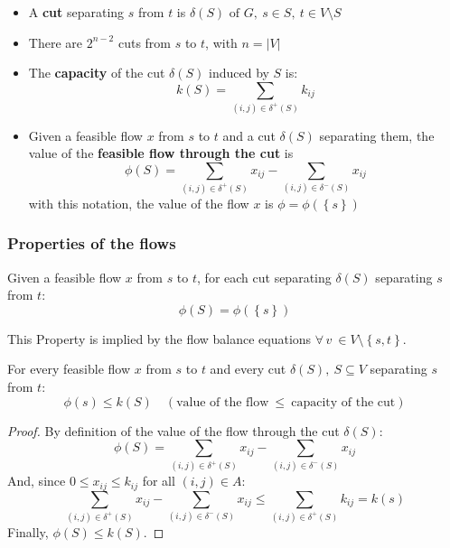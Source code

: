 \documentclass[english]{article}
\begin{document}
\begin{itemize}
  \item A \textbf{cut} separating \(s\) from \(t\) is \(\delta(S) \text{ of } G, \ s \in S, \ t \in V \setminus S\)
  \item There are \(2^{n-2}\) cuts from \(s\) to \(t\), with \(n = |V|\)
  \item The \textbf{capacity} of the cut \(\delta(S)\) induced by \(S\) is: \[ k(S) = \displaystyle \sum_{\left( i, j \right) \in \delta^+(S)} k_{ij} \]
  \item Given a feasible flow \(x\) from \(s\) to \(t\) and a cut \(\delta(S)\) separating them, the value of the \textbf{feasible flow through the cut} is \[\phi(S) = \displaystyle \sum_{\left( i, j \right) \in \delta^+(S)} x_{ij} - \sum_{\left( i, j \right) \in \delta^-(S)} x_{ij}\]
        with this notation, the value of the flow \(x\) is \(\phi = \phi\left( \left\{ s \right\} \right)\)
\end{itemize}

\subsubsection{Properties of the flows}

\begin{property}
  Given a feasible flow \(x\) from \(s\) to \(t\), for each cut separating \(\delta(S)\) separating \(s\) from \(t\):
  \[ \phi(S) = \phi\left( \left\{ s \right\} \right) \]

  This Property is implied by the flow balance equations \(\forall \, v \ \in V \setminus \left\{ s, t \right\}\).
\end{property}

\begin{property}
  \label{prop:weak-duality}
  For every feasible flow \(x\) from \(s\) to \(t\) and every cut \(\delta(S), \ S \subseteq V\) separating \(s\) from \(t\):
  \[ \phi(s) \leq k(S) \quad \left( \text{value of the flow} \ \leq \ \text{capacity of the cut} \right)\]
\end{property}

\begin{proof}
  By definition of the value of the flow through the cut \(\delta(S)\):
  \[ \phi(S) = \displaystyle \sum_{\left( i, j \right) \in \delta^+(S)} x_{ij} - \sum_{\left( i, j \right) \in \delta^-(S)} x_{ij} \]
  And, since \(0 \leq x_{ij} \leq k_{ij}\) for all \(\left( i, j \right) \in A\):
  \[ \displaystyle \sum_{\left( i, j \right) \in \delta^+(S)} x_{ij} - \sum_{\left( i, j \right) \in \delta^-(S)} x_{ij} \leq \displaystyle \sum_{\left( i, j \right) \in \delta^+(S)} k_{ij} = k(s) \]
  Finally, \(\phi(S) \leq k(S)\).
\end{proof}
\end{document}

